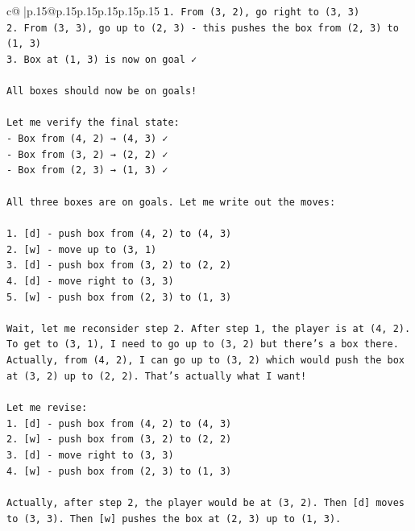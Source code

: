 \documentclass{article}
\begin{document}
{\begin{supertabular}{c@{$\;$}|p{.15\linewidth}@{}p{.15\linewidth}p{.15\linewidth}p{.15\linewidth}p{.15\linewidth}p{.15\linewidth}}
{{{\texttt{1. From (3, 2), go right to (3, 3)} \\
\texttt{2. From (3, 3), go up to (2, 3) {-} this pushes the box from (2, 3) to (1, 3)} \\
\texttt{3. Box at (1, 3) is now on goal ✓} \\
\\ 
\texttt{All boxes should now be on goals!} \\
\\ 
\texttt{Let me verify the final state:} \\
\texttt{{-} Box from (4, 2) → (4, 3) ✓} \\
\texttt{{-} Box from (3, 2) → (2, 2) ✓} \\
\texttt{{-} Box from (2, 3) → (1, 3) ✓} \\
\\ 
\texttt{All three boxes are on goals. Let me write out the moves:} \\
\\ 
\texttt{1. {[}d{]} {-} push box from (4, 2) to (4, 3)} \\
\texttt{2. {[}w{]} {-} move up to (3, 1)} \\
\texttt{3. {[}d{]} {-} push box from (3, 2) to (2, 2)} \\
\texttt{4. {[}d{]} {-} move right to (3, 3)} \\
\texttt{5. {[}w{]} {-} push box from (2, 3) to (1, 3)} \\
\\ 
\texttt{Wait, let me reconsider step 2. After step 1, the player is at (4, 2). To get to (3, 1), I need to go up to (3, 2) but there's a box there. Actually, from (4, 2), I can go up to (3, 2) which would push the box at (3, 2) up to (2, 2). That's actually what I want!} \\
\\ 
\texttt{Let me revise:} \\
\texttt{1. {[}d{]} {-} push box from (4, 2) to (4, 3)} \\
\texttt{2. {[}w{]} {-} push box from (3, 2) to (2, 2)} \\
\texttt{3. {[}d{]} {-} move right to (3, 3)} \\
\texttt{4. {[}w{]} {-} push box from (2, 3) to (1, 3)} \\
\\ 
\texttt{Actually, after step 2, the player would be at (3, 2). Then {[}d{]} moves to (3, 3). Then {[}w{]} pushes the box at (2, 3) up to (1, 3).} \\
\\ 
}}}
\end{supertabular}}
\end{document}
